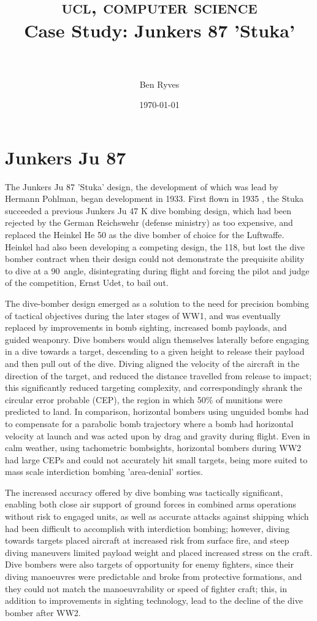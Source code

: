 \documentclass[a4paper, fontsize=11pt]{scrartcl} %
\title{
        \normalfont \normalsize
        \textsc{ucl, computer science}
        \horrule{0.5pt} \\[0.4cm]
        \huge{Case Study: Junkers 87 'Stuka'}\\
        \horrule{0.5pt} \\[0.5cm]
}
\author{Ben Ryves}
\date{\normalsize\today}
\begin{document}
\maketitle




\section{Junkers Ju 87}

The Junkers Ju 87 'Stuka' design, the development of
which was lead by Hermann Pohlman, began development in 1933. First flown
in 1935 \autocite[p.~9]{weal97}, the Stuka succeeded a previous
Junkers Ju 47 K dive bombing design, which had been rejected by the
German Reichswehr (defense ministry) as too expensive, and replaced the
Heinkel He 50 as the dive bomber of choice for the Luftwaffe. Heinkel
had also been developing a competing design, the 118, but lost the dive
bomber contract when their design could not demonstrate the prequisite
ability to dive at a 90\textdegree\ angle, disintegrating during flight
\autocite[p.~68-69]{killen67} and forcing the pilot and judge of the
competition, Ernst Udet, to bail out.

The dive-bomber design emerged as a solution to the need for precision
bombing of tactical objectives during the later stages of
WW1, and was eventually replaced by improvements in bomb sighting,
increased bomb payloads, and guided weaponry. Dive bombers would align themselves
laterally before engaging in a dive towards a target,
descending to a given height to release their payload and then pull
out of the dive. Diving aligned the velocity of the aircraft in the
direction of the target, and reduced the distance travelled from release
to impact; this significantly reduced targeting complexity, and
correspondingly shrank the circular error probable (CEP), the
region in which 50\% of munitions were predicted to land. In comparison,
horizontal bombers using unguided bombs had to compensate for a parabolic
bomb trajectory where a bomb had horizontal velocity at launch and was
acted upon by drag and gravity during flight. Even in
calm weather, using tachometric bombsights, horizontal bombers during
WW2 had large CEPs and could not accurately hit small targets, being
more suited to mass scale interdiction bombing 'area-denial' sorties.

The increased accuracy offered by dive bombing was tactically
significant, enabling both close air support
of ground forces in combined arms operations without risk to engaged
units, as well as accurate attacks against shipping which had been
difficult to accomplish with interdiction bombing; however, diving
towards targets placed aircraft at increased risk from surface fire, and
steep diving maneuvers limited payload weight and placed increased
stress on the craft. Dive bombers were also targets of opportunity for
enemy fighters, since their diving manoeuvres were predictable and broke from
protective formations, and they could not match the manoeuvrability or
speed of fighter craft; this, in addition to improvements in sighting
technology, lead to the decline of the dive bomber after WW2.
\end{document}
